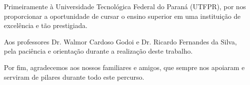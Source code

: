 \begin{agradecimentos}

Primeiramente à Universidade Tecnológica Federal do Paraná (UTFPR), por nos proporcionar a oportunidade de cursar o ensino superior em uma instituição de excelência e tão prestigiada.

Aos professores Dr. Walmor Cardoso Godoi e Dr. Ricardo Fernandes da Silva, pela paciência e orientação durante a realização deste trabalho.

Por fim, agradecemos aos nossos familiares e amigos, que sempre nos apoiaram e serviram de pilares durante todo este percurso.

\end{agradecimentos}
